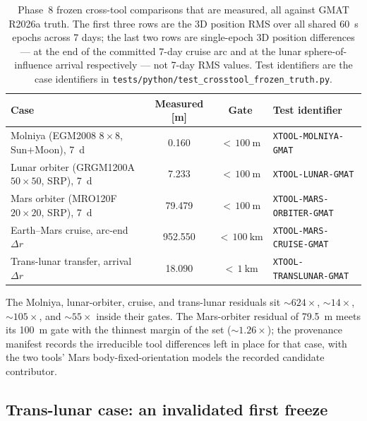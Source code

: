 \documentclass[10pt]{article}
\begin{document}
\begin{table}[htbp]
\centering
\caption{Phase~8 frozen cross-tool comparisons that are measured, all against
  GMAT R2026a truth. The first three rows are the 3D position RMS over all
  shared 60~s epochs across 7 days; the last two rows are single-epoch 3D
  position differences --- at the end of the committed 7-day cruise arc and at
  the lunar sphere-of-influence arrival respectively --- not 7-day RMS values.
  Test identifiers are the case identifiers in
  \texttt{tests/python/test\_crosstool\_frozen\_truth.py}.}
\label{tab:crosstool8}
\small
\begin{tabular}{@{}lS[table-format=3.3]cl@{}}
\toprule
Case & {Measured [\si{\meter}]} & Gate & Test identifier \\
\midrule
Molniya (EGM2008 $8\times8$, Sun$+$Moon), 7~d & 0.160 &
  ${<}\,\SI{100}{\meter}$ & \texttt{XTOOL-MOLNIYA-GMAT} \\
Lunar orbiter (GRGM1200A $50\times50$, SRP), 7~d & 7.233 &
  ${<}\,\SI{100}{\meter}$ & \texttt{XTOOL-LUNAR-GMAT} \\
Mars orbiter (MRO120F $20\times20$, SRP), 7~d & 79.479 &
  ${<}\,\SI{100}{\meter}$ & \texttt{XTOOL-MARS-ORBITER-GMAT} \\
Earth--Mars cruise, arc-end $\Delta r$ & 952.550 &
  ${<}\,\SI{100}{\kilo\meter}$ & \texttt{XTOOL-MARS-CRUISE-GMAT} \\
Trans-lunar transfer, arrival $\Delta r$ & 18.090 &
  ${<}\,\SI{1}{\kilo\meter}$ & \texttt{XTOOL-TRANSLUNAR-GMAT} \\
\bottomrule
\end{tabular}
\end{table}

The Molniya, lunar-orbiter, cruise, and trans-lunar residuals sit
${\sim}624\times$, ${\sim}14\times$, ${\sim}105\times$, and ${\sim}55\times$
inside their gates. The Mars-orbiter
residual of \SI{79.5}{\meter} meets its \SI{100}{\meter} gate with the
thinnest margin of the set (${\sim}1.26\times$); the provenance manifest
records the irreducible tool differences left in place for that case, with the
two tools' Mars body-fixed-orientation models the recorded candidate
contributor.

\subsection{Trans-lunar case: an invalidated first freeze}
\label{sec:vv-translunar}
\end{document}
